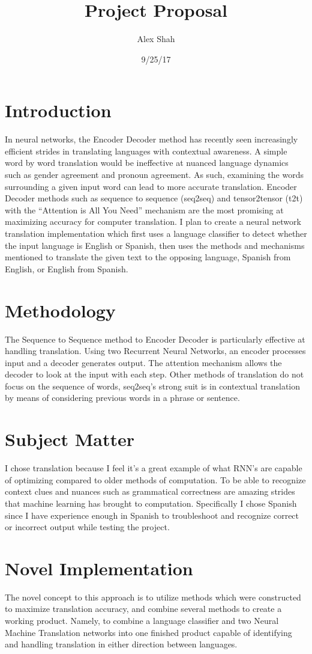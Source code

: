 \documentclass[10pt,a4paper]{report}
\begin{document}
\title{Project Proposal}
\author{Alex Shah}
\date{9/25/17}
\maketitle

\section{Introduction}
In neural networks, the Encoder Decoder method has recently seen increasingly efficient strides in translating languages with contextual awareness. A simple word by word translation would be ineffective at nuanced language dynamics such as gender agreement and pronoun agreement. As such, examining the words surrounding a given input word can lead to more accurate translation. Encoder Decoder methods such as sequence to sequence (seq2seq) and tensor2tensor (t2t) with the “Attention is All You Need” mechanism are the most promising at maximizing accuracy for computer translation. I plan to create a neural network translation implementation which first uses a language classifier to detect whether the input language is English or Spanish, then uses the methods and mechanisms mentioned to translate the given text to the opposing language, Spanish from English, or English from Spanish.

\section{Methodology}
The Sequence to Sequence method to Encoder Decoder is particularly effective at handling translation. Using two Recurrent Neural Networks, an encoder processes input and a decoder generates output. The attention mechanism allows the decoder to look at the input with each step. Other methods of translation do not focus on the sequence of words, seq2seq’s strong suit is in contextual translation by means of considering previous words in a phrase or sentence.

\section{Subject Matter}
I chose translation because I feel it’s a great example of what RNN’s are capable of optimizing compared to older methods of computation. To be able to recognize context clues and nuances such as grammatical correctness are amazing strides that machine learning has brought to computation. Specifically I chose Spanish since I have experience enough in Spanish to troubleshoot and recognize correct or incorrect output while testing the project.

\section{Novel Implementation}
The novel concept to this approach is to utilize methods which were constructed to maximize translation accuracy, and combine several methods to create a working product. Namely, to combine a language classifier and two Neural Machine Translation networks into one finished product capable of identifying and handling translation in either direction between languages.
\end{document}
